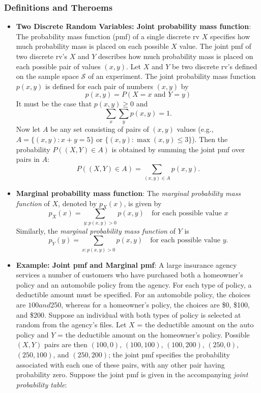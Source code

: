 \documentclass{report}
\begin{document}
    \subsubsection{Definitions and Theroems}
    \begin{itemize}
        \item \textbf{Two Discrete Random Variables: Joint probability mass function}:
            The probability mass function (pmf) of a single discrete rv \( X \) specifies how much probability mass is placed on each possible \( X \) value. The joint pmf of two discrete rv's \( X \) and \( Y \) describes how much probability mass is placed on each possible pair of values \((x, y)\).
            \bigbreak \noindent 
            Let \( X \) and \( Y \) be two discrete rv's defined on the sample space \( \mathcal{S} \) of an experiment. The joint probability mass function \( p(x, y) \) is defined for each pair of numbers \((x, y)\) by
            \[ 
                p(x, y) = P(X = x \text{ and } Y = y) 
            \]
            It must be the case that \( p(x, y) \geq 0 \) and 
            \[
                \sum_x \sum_y p(x, y) = 1.
            \]
            Now let \( A \) be any set consisting of pairs of \((x, y)\) values (e.g., \( A = \{(x, y): x + y = 5\} \) or \(\{(x, y): \max(x, y) \leq 3\} \)). Then the probability \( P((X, Y) \in A) \) is obtained by summing the joint pmf over pairs in \( A \):
            \[
                P((X, Y) \in A) = \sum_{(x, y) \in A} p(x, y).
            \]
        \item \textbf{Marginal probability mass function}:
            The \textit{marginal probability mass function} of \(X\), denoted by \(p_X(x)\), is given by
            \[
                p_X(x) = \sum_{y: p(x, y) > 0} p(x, y) \quad \text{for each possible value } x
            \]
            Similarly, the \textit{marginal probability mass function} of \(Y\) is
            \[
                p_Y(y) = \sum_{x: p(x, y) > 0} p(x, y) \quad \text{for each possible value } y.
            \]
        \item \textbf{Example: Joint pmf and Marginal pmf}:
            A large insurance agency services a number of customers who have purchased both a homeowner’s policy and an automobile policy from the agency. For each type of policy, a deductible amount must be specified. For an automobile policy, the choices are $100 and $250, whereas for a homeowner’s policy, the choices are \$0, \$100, and \$200. Suppose an individual with both types of policy is selected at random from the agency’s files. Let \( X \) = the deductible amount on the auto policy and \( Y \) = the deductible amount on the homeowner’s policy. Possible \((X, Y)\) pairs are then \((100, 0)\), \((100, 100)\), \((100, 200)\), \((250, 0)\), \((250, 100)\), and \((250, 200)\); the joint pmf specifies the probability associated with each one of these pairs, with any other pair having probability zero. Suppose the joint pmf is given in the accompanying \textit{joint probability table}:

\end{itemize}
\end{document}
